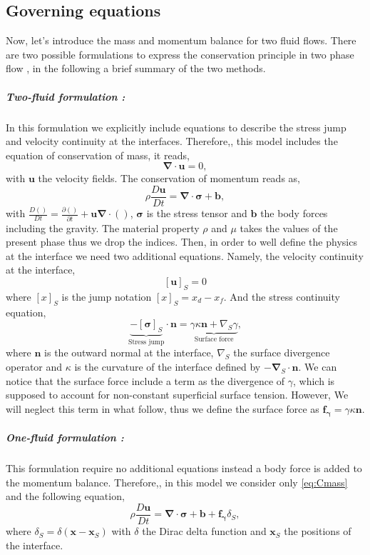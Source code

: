 \subsection{Governing equations}
Now, let's introduce the mass and momentum balance for two fluid flows. 
There are two possible formulations to express the conservation principle in two phase flow \citep{tryggvason2011direct}, in the following a brief summary of the two methods.

\subparagraph*{Two-fluid formulation :} In this formulation we explicitly include equations to describe the stress jump and velocity continuity at the interfaces.
Therefore,, this model includes the equation of conservation of mass, it reads,
\begin{equation}
    \label{eq:Cmass}
    \bm{\nabla} \cdot \bm{u}= 0,
\end{equation}  
with $\bm{u}$ the velocity fields.
The conservation of momentum reads as,
\begin{equation}
    \label{eq:Cmomentum}
    \rho \frac{D \bm{u}}{Dt} = \bm{\nabla} \cdot \bm{\sigma} + \bm{b},
\end{equation}
with $\frac{D ()}{Dt}  =  \frac{\partial ()}{\partial t}  + \bm{u} \bm{\nabla} \cdot ()$, $\bm{\sigma}$ is the stress tensor and $\bm{b}$ the body forces including the gravity. 
The material property $\rho$ and $\mu$ takes the values of the present phase thus we drop the indices.  
Then, in order to well define the physics at the interface we need two additional equations. 
Namely, the velocity continuity at the interface,
\begin{equation*}
    \left[\bm{u}\right]_S = 0
\end{equation*}
where $[x]_S$ is the jump notation $ [x]_S = x_d-x_f$.
And the stress continuity equation,
\begin{equation*}
    \underbrace{-[\bm{\sigma}]_S}_{\text{Stress jump}} \cdot \bm{n} = \underbrace{\gamma \kappa \bm{n} +\nabla_S \gamma}_{\text{Surface force}},
\end{equation*}
where $\bm{n}$ is the outward normal at the interface, $\nabla_S$ the surface divergence operator and $\kappa$ is the curvature of the interface defined by $-\bm{\nabla}_S\cdot\bm{n}$. 
We can notice that the surface force include a term as the divergence of $\gamma$, which is supposed to account for non-constant superficial surface tension.
However, We will neglect this term in what follow, thus we define the surface force as $\bm{f_\gamma} = \gamma \kappa \bm{n}$.
\subparagraph*{One-fluid formulation :} This formulation require no additional equations instead a body force is added to the momentum balance. 
Therefore,, in this model we consider only \ref{eq:Cmass} and the following equation,
\begin{equation}
    \label{CmomentumOnefluide}
    \rho \frac{D \bm{u}}{Dt} = \bm{\nabla} \cdot \bm{\sigma} + \bm{b} + \bm{f_\gamma} \delta_S ,
\end{equation}
where $\delta_S = \delta(\bm{x} - \bm{x}_S)$ with $\delta$ the Dirac delta function and $\bm{x}_S$ the positions of the interface.

